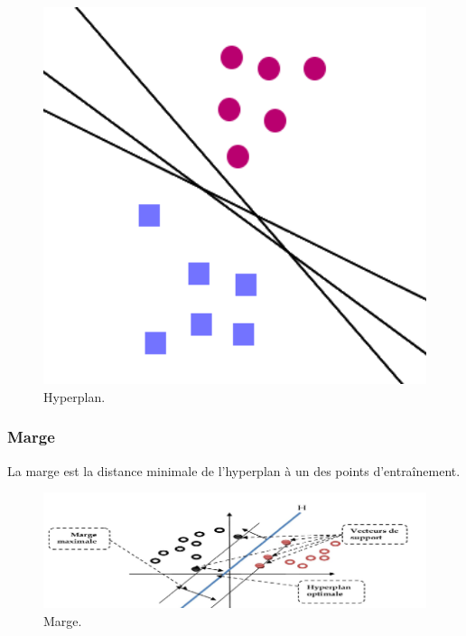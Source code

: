 \begin{figure}[h!]
\begin{center}
\includegraphics[width=14cm]
{images/hyperplan.png}
\caption{Hyperplan.\label{fig:hyperplan}}
\end{center}
\end{figure}

\subsubsection{Marge}
La marge est la distance minimale de l’hyperplan à un des points d’entraînement.

\begin{figure}[h!]
\begin{center}
\includegraphics[width=14cm]
{images/marge.png}
\caption{Marge.\label{fig:marge}}
\end{center}
\end{figure}

